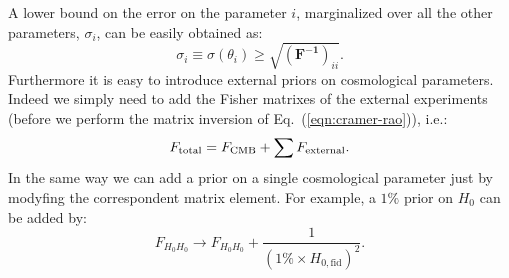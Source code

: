 \documentclass[aps,prd,reprint,superscriptaddress]{revtex4-1}
\newcommand\refeq[1]{Eq.~(\ref{eqn:#1})}
\begin{document}
A lower bound on the error on the parameter $i$, marginalized over all the other parameters, $\sigma_i$, can be easily obtained as:
\begin{equation}
\sigma_i \equiv \sigma (\theta_i) \geq \sqrt{(\mathbf{ F^{-1}})_{ii}}.
\label{eqn:cramer-rao}
\end{equation}
Furthermore it is easy to introduce external priors on cosmological parameters.
Indeed we simply need to add the Fisher matrixes of the external experiments (before we perform the matrix inversion of \refeq{cramer-rao}), i.e.:
\begin{equation}
F_{\rm total}=F_{\rm CMB}+\sum F_{\rm external}.
\end{equation}
In the same way we can add a prior on a single cosmological parameter just by modyfing the correspondent matrix element.
For example, a $1\%$ prior on $H_{0}$ can be added by:
\begin{equation}
F_{H_0 H_0} \rightarrow F_{H_0 H_0} + \frac{1}{(1\% \times H_{0,\text{fid}})^2}.
\end{equation}
\end{document}
